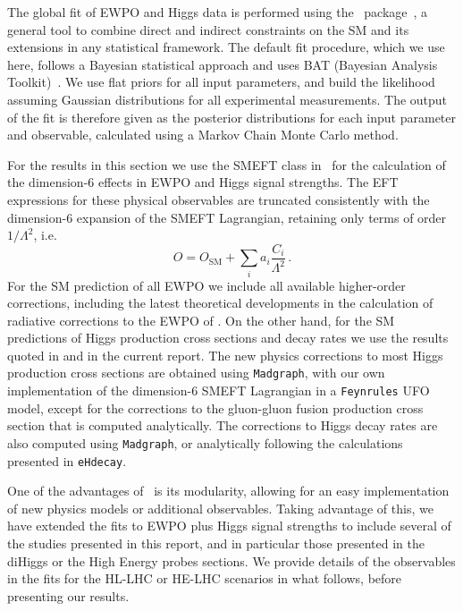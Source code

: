 The global fit of EWPO and Higgs data is performed using the
\HEPfit~package~\cite{hepfitsite}, a general tool to combine direct
and indirect constraints on the SM and its extensions in any
statistical framework.  The default fit procedure, which we use here,
follows a Bayesian statistical approach and uses BAT (Bayesian
Analysis Toolkit)~\cite{Caldwell:2008fw}. We use flat priors for all
input parameters, and build the likelihood assuming Gaussian
distributions for all experimental measurements. The output of the fit
is therefore given as the posterior distributions for each input
parameter and observable, calculated using a Markov Chain Monte
Carlo method.

For the results in this section we use the SMEFT class in \HEPfit~for 
the calculation of the dimension-6 effects in EWPO and Higgs signal strengths.
The EFT expressions for these physical observables are truncated
consistently with the dimension-6 expansion of the SMEFT Lagrangian, 
retaining only terms of order
$1/\Lambda^2$, i.e.
%
\begin{equation}
O=O_{\mathrm{SM}} + \sum_i a_i \frac{C_i}{\Lambda^2}\,.
\end{equation}
%
For the SM prediction of
all EWPO we include all available higher-order corrections, including the latest
theoretical developments in the calculation of radiative corrections
to the EWPO of \cite{Dubovyk:2016aqv,Dubovyk:2018rlg}.
On the other hand,  for the SM predictions of
Higgs production cross sections and decay rates we use the results
quoted in \cite{deFlorian:2016spz} and in the current report. 
The new physics corrections to most
Higgs production cross sections are obtained using {\tt Madgraph},
with our own implementation of the dimension-6 SMEFT Lagrangian in a
{\tt Feynrules} UFO model, except for the corrections to the
gluon-gluon fusion production cross section that is computed
analytically. The corrections to Higgs decay rates are
also computed using {\tt Madgraph}, or analytically following
the calculations presented in {\tt eHdecay}.

One of the advantages of \HEPfit~is its modularity, allowing for an
easy implementation of new physics models or additional observables.
Taking advantage of this, we have extended the fits to EWPO plus Higgs 
signal strengths to include several of the studies presented in this report, 
and in particular those presented in the diHiggs or the High Energy probes sections.
We provide details of the observables in the fits for the HL-LHC or HE-LHC 
scenarios in what follows, before presenting our results.

